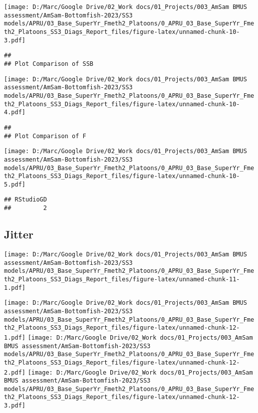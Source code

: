 \documentclass[
]{article}
\begin{document}
\texttt{[image: D:/Marc/Google Drive/02\_Work docs/01\_Projects/003\_AmSam BMUS assessment/AmSam-Bottomfish-2023/SS3 models/APRU/03\_Base\_SuperYr\_Fmeth2\_Platoons/0\_APRU\_03\_Base\_SuperYr\_Fmeth2\_Platoons\_SS3\_Diags\_Report\_files/figure-latex/unnamed-chunk-10-3.pdf]}

\begin{verbatim}
## 
## Plot Comparison of SSB
\end{verbatim}

\texttt{[image: D:/Marc/Google Drive/02\_Work docs/01\_Projects/003\_AmSam BMUS assessment/AmSam-Bottomfish-2023/SS3 models/APRU/03\_Base\_SuperYr\_Fmeth2\_Platoons/0\_APRU\_03\_Base\_SuperYr\_Fmeth2\_Platoons\_SS3\_Diags\_Report\_files/figure-latex/unnamed-chunk-10-4.pdf]}

\begin{verbatim}
## 
## Plot Comparison of F
\end{verbatim}

\texttt{[image: D:/Marc/Google Drive/02\_Work docs/01\_Projects/003\_AmSam BMUS assessment/AmSam-Bottomfish-2023/SS3 models/APRU/03\_Base\_SuperYr\_Fmeth2\_Platoons/0\_APRU\_03\_Base\_SuperYr\_Fmeth2\_Platoons\_SS3\_Diags\_Report\_files/figure-latex/unnamed-chunk-10-5.pdf]}

\begin{verbatim}
## RStudioGD 
##         2
\end{verbatim}

\hypertarget{jitter}{%
\subsection{Jitter}\label{jitter}}

\texttt{[image: D:/Marc/Google Drive/02\_Work docs/01\_Projects/003\_AmSam BMUS assessment/AmSam-Bottomfish-2023/SS3 models/APRU/03\_Base\_SuperYr\_Fmeth2\_Platoons/0\_APRU\_03\_Base\_SuperYr\_Fmeth2\_Platoons\_SS3\_Diags\_Report\_files/figure-latex/unnamed-chunk-11-1.pdf]}

\texttt{[image: D:/Marc/Google Drive/02\_Work docs/01\_Projects/003\_AmSam BMUS assessment/AmSam-Bottomfish-2023/SS3 models/APRU/03\_Base\_SuperYr\_Fmeth2\_Platoons/0\_APRU\_03\_Base\_SuperYr\_Fmeth2\_Platoons\_SS3\_Diags\_Report\_files/figure-latex/unnamed-chunk-12-1.pdf]}
\texttt{[image: D:/Marc/Google Drive/02\_Work docs/01\_Projects/003\_AmSam BMUS assessment/AmSam-Bottomfish-2023/SS3 models/APRU/03\_Base\_SuperYr\_Fmeth2\_Platoons/0\_APRU\_03\_Base\_SuperYr\_Fmeth2\_Platoons\_SS3\_Diags\_Report\_files/figure-latex/unnamed-chunk-12-2.pdf]}
\texttt{[image: D:/Marc/Google Drive/02\_Work docs/01\_Projects/003\_AmSam BMUS assessment/AmSam-Bottomfish-2023/SS3 models/APRU/03\_Base\_SuperYr\_Fmeth2\_Platoons/0\_APRU\_03\_Base\_SuperYr\_Fmeth2\_Platoons\_SS3\_Diags\_Report\_files/figure-latex/unnamed-chunk-12-3.pdf]}

\hypertarget{section}{%
\subsection{}\label{section}}
\end{document}

